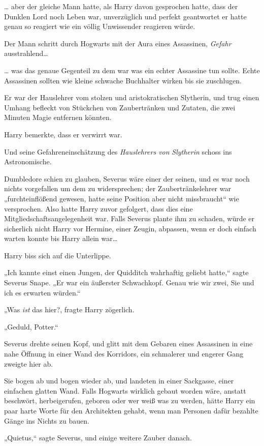 {… aber der gleiche Mann hatte, als Harry davon gesprochen hatte, dass der Dunklen Lord noch Leben war, unverzüglich und perfekt geantwortet \later er hatte genau so reagiert wie ein völlig Unwissender reagieren würde.

Der Mann schritt durch Hogwarts mit der Aura eines Assassinen, \emph{Gefahr} ausstrahlend…

… was das genaue Gegenteil zu dem war was ein echter Assassine tun sollte. Echte Assassinen sollten wie kleine schwache Buchhalter wirken bis sie zuschlugen.

Er war der Hauslehrer vom stolzen und aristokratischen Slytherin, und trug einen Umhang befleckt von Stückchen von Zaubertränken und Zutaten, die zwei Minuten Magie entfernen könnten.

Harry bemerkte, dass er verwirrt war.

Und seine Gefahreneinschätzung des \emph{Hauslehrers von} \emph{Slytherin} schoss ins Astronomische.

Dumbledore schien zu glauben, Severus wäre einer der seinen, und es war noch nichts vorgefallen um dem zu widersprechen; der Zaubertränkelehrer war „furchteinflößend gewesen, hatte seine Position aber nicht missbraucht“ wie versprochen. Also hatte Harry zuvor gefolgert, dass dies eine Mitgliedschaftsangelegenheit war. Falls Severus plante ihm zu schaden, würde er sicherlich nicht Harry vor Hermine, einer Zeugin, abpassen, wenn er doch einfach warten konnte bis Harry allein war…

Harry biss sich auf die Unterlippe.

„Ich kannte einst einen Jungen, der Quidditch wahrhaftig geliebt hatte,“ sagte Severus Snape. „Er war ein äußerster Schwachkopf. Genau wie wir zwei, Sie und ich es erwarten würden.“

„Was \emph{ist} das hier?, fragte Harry zögerlich.

„Geduld, Potter.“

Severus drehte seinen Kopf, und glitt mit dem Gebaren eines Assassinen in eine nahe Öffnung in einer Wand des Korridors, ein schmalerer und engerer Gang zweigte hier ab.

Sie bogen ab und bogen wieder ab, und landeten in einer Sackgasse, einer einfachen glatten Wand. Falls Hogwarts wirklich gebaut worden wäre, anstatt beschwört, herbeigerufen, geboren oder wer weiß was zu werden, hätte Harry ein paar harte Worte für den Architekten gehabt, wenn man Personen dafür bezahlte Gänge ins Nichts zu bauen.

„Quietus,“ sagte Severus, und einige weitere Zauber danach.

}
